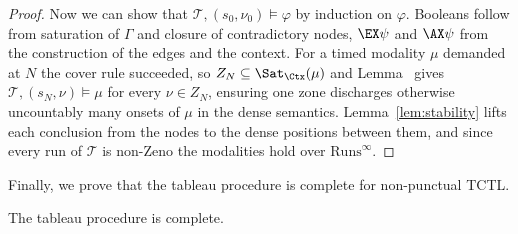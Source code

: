 \begin{proof}
Now we can show that $\mathcal{T},(s_0,\nu_0)\models\varphi$ by induction on $\varphi$. Booleans follow
from saturation of $\Gamma$ and closure of contradictory nodes, $\EX\psi$ and $\AX\psi$ from
the construction of the edges and the context. For a timed modality $\mu$ demanded at $N$ the
cover rule succeeded, so $Z_N\subseteq\Sat_{\Ctx}(\mu)$ and Lemma~ gives
$\mathcal{T},(s_N,\nu)\models\mu$ for every $\nu\in Z_N$, ensuring one zone discharges otherwise uncountably many onsets of $\mu$ in the dense semantics.
Lemma~\ref{lem:stability} lifts each conclusion from the nodes to the dense positions between
them, and since every run of $\mathcal{T}$ is non-Zeno the modalities hold over
$\mathrm{Runs}^\infty$.%
\end{proof}

\noindent Finally, we prove that the tableau procedure is complete for non-punctual TCTL.
\begin{theorem}%
    \label{thm:completeness}
    The tableau procedure is complete.
\end{theorem}
